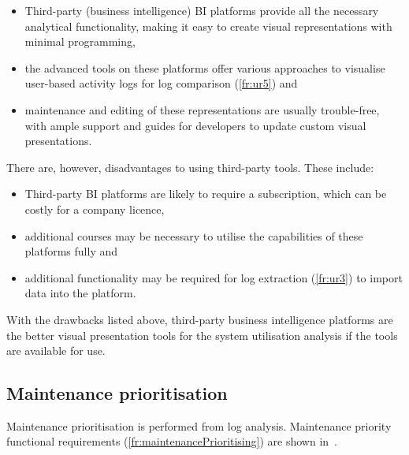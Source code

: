 \begin{itemize}
	\item \RaggedRight Third-party (business intelligence) BI platforms provide all the necessary analytical functionality, making it easy to create visual representations with minimal programming,
	\item \RaggedRight the advanced tools on these platforms offer various approaches to visualise user-based activity logs for log comparison (\ref{fr:ur5}) and
	\item \RaggedRight maintenance and editing of these representations are usually trouble-free, with ample support and guides for developers to update custom visual presentations.
\end{itemize}

\clearpage

There are, however, disadvantages to using third-party tools. These include:

\begin{itemize}
	\item \RaggedRight Third-party BI platforms are likely to require a subscription, which can be costly for a company licence,
	\item \RaggedRight additional courses may be necessary to utilise the capabilities of these platforms fully and
	\item \RaggedRight additional functionality may be required for log extraction (\ref{fr:ur3}) to import data into the platform.
	\end{itemize}

With the drawbacks listed above, third-party business intelligence platforms are the better visual presentation tools for the system utilisation analysis if the tools are available for use.

\subsection{Maintenance prioritisation}\label{sec:ch2_utilisationImprovements}
Maintenance prioritisation is performed from log analysis. Maintenance priority functional requirements (\ref{fr:maintenancePrioritising}) are shown in~.

